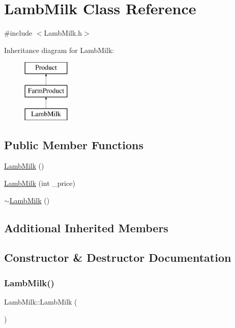 \hypertarget{classLambMilk}{}\section{Lamb\+Milk Class Reference}
\label{classLambMilk}


{\ttfamily \#include $<$Lamb\+Milk.\+h$>$}

Inheritance diagram for Lamb\+Milk\+:\begin{figure}[H]
\begin{center}
\leavevmode
\includegraphics[height=3.000000cm]{classLambMilk}
\end{center}
\end{figure}
\subsection*{Public Member Functions}
\begin{DoxyCompactItemize}
\item 
\mbox{\hyperlink{classLambMilk_a9dd198eeef2dd4c9303c3b5dc861bdd6}{Lamb\+Milk}} ()
\item 
\mbox{\hyperlink{classLambMilk_a96878c1e2a147c54bfb7f1e2fa437d3e}{Lamb\+Milk}} (int \+\_\+price)
\item 
\mbox{\hyperlink{classLambMilk_ae1fe22db66d3021363aed69d45b4b161}{$\sim$\+Lamb\+Milk}} ()
\end{DoxyCompactItemize}
\subsection*{Additional Inherited Members}


\subsection{Constructor \& Destructor Documentation}
\mbox{\label{classLambMilk_a9dd198eeef2dd4c9303c3b5dc861bdd6}} 
\subsubsection{\texorpdfstring{LambMilk()}{LambMilk()}\hspace{0.1cm}{\footnotesize\ttfamily [1/2]}}
{\footnotesize\ttfamily Lamb\+Milk\+::\+Lamb\+Milk (\begin{DoxyParamCaption}{ }\end{DoxyParamCaption})}

